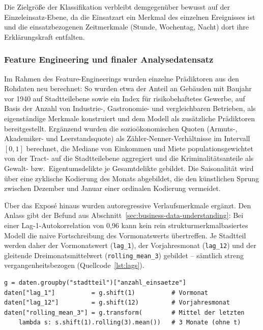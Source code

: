 Die Zielgröße der Klassifikation verbleibt demgegenüber bewusst auf der
Einzeleinsatz-Ebene, da die Einsatzart ein Merkmal des einzelnen Ereignisses
ist und die einsatzbezogenen Zeitmerkmale (Stunde, Wochentag, Nacht) dort
ihre Erklärungskraft entfalten.

\subsubsection{Feature Engineering und finaler Analysedatensatz}
\label{sec:feature-engineering}

Im Rahmen des Feature-Engineerings wurden einzelne Prädiktoren aus den
Rohdaten neu berechnet: So wurden etwa der Anteil an Gebäuden mit Baujahr vor
1940 auf Stadtteilebene sowie ein Index für risikobehaftetes Gewerbe, auf
Basis der Anzahl von Industrie-, Gastronomie- und vergleichbaren Betrieben,
als eigenständige Merkmale konstruiert und dem Modell als zusätzliche
Prädiktoren bereitgestellt.
Ergänzend wurden die sozioökonomischen Quoten (Armuts-, Akademiker- und
Leerstandsquote) als Zähler-Nenner-Verhältnisse im Intervall $[0,1]$
berechnet, die Mediane von Einkommen und Miete populationsgewichtet von der
Tract- auf die Stadtteilebene aggregiert und die Kriminalitätsanteile als
Gewalt- bzw.\ Eigentumsdelikte je Gesamtdelikte gebildet. Die Saisonalität
wird über eine zyklische Kodierung des Monats abgebildet, die den
künstlichen Sprung zwischen Dezember und Januar einer ordinalen Kodierung
vermeidet.

Über das Exposé hinaus wurden autoregressive Verlaufsmerkmale ergänzt. Den
Anlass gibt der Befund aus Abschnitt~\ref{sec:business-data-understanding}:
Bei einer Lag-1-Autokorrelation von 0,96 kann kein rein
struktur\-merkmalbasiertes Modell die naive Fortschreibung des
Vormonatswerts übertreffen. Je Stadtteil werden daher der Vormonatswert
(\texttt{lag\_1}), der Vorjahresmonat (\texttt{lag\_12}) und der gleitende
Dreimonatsmittelwert (\texttt{rolling\_mean\_3}) gebildet -- sämtlich streng
vergangenheitsbezogen (Quellcode~\ref{lst:lags}).

\begin{lstlisting}[caption={Streng vergangenheitsbezogene Lag-Merkmale je
Stadtteil (Ausschnitt aus \texttt{modellierung/demo\_modellierung.py})},
label=lst:lags]
g = daten.groupby("stadtteil")["anzahl_einsaetze"]
daten["lag_1"]          = g.shift(1)          # Vormonat
daten["lag_12"]         = g.shift(12)         # Vorjahresmonat
daten["rolling_mean_3"] = g.transform(        # Mittel der letzten
    lambda s: s.shift(1).rolling(3).mean())   # 3 Monate (ohne t)
\end{lstlisting}

